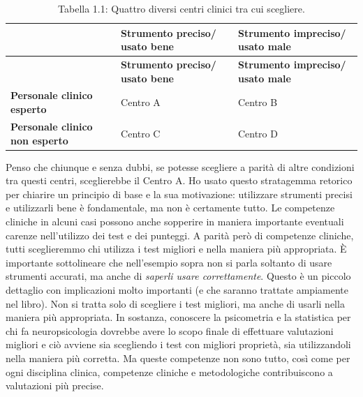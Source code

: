 \documentclass[
  italian,
  letterpaper,
  paper=A4,
  headinclude=on,
  footinclude=on,
  12pt]{scrbook}
\begin{document}
\begingroup
{\footnotesize

\begin{longtable}[]{@{}
  >{\centering\arraybackslash}p{}
  >{\centering\arraybackslash}p{}
  >{\centering\arraybackslash}p{}@{}}
\caption{Tabella 1.1: Quattro diversi centri clinici tra cui
scegliere.}\tabularnewline
\toprule\noalign{}
\begin{minipage}[b]{\linewidth}\centering
\end{minipage} & \begin{minipage}[b]{\linewidth}\centering
\textbf{Strumento preciso/ usato bene }
\end{minipage} & \begin{minipage}[b]{\linewidth}\centering
\textbf{Strumento impreciso/ usato male}
\end{minipage} \\
\midrule\noalign{}
\endfirsthead
\toprule\noalign{}
\begin{minipage}[b]{\linewidth}\centering
\end{minipage} & \begin{minipage}[b]{\linewidth}\centering
\textbf{Strumento preciso/ usato bene }
\end{minipage} & \begin{minipage}[b]{\linewidth}\centering
\textbf{Strumento impreciso/ usato male}
\end{minipage} \\
\midrule\noalign{}
\endhead
\bottomrule\noalign{}
\endlastfoot
\textbf{Personale clinico esperto} & Centro A & Centro B \\
\textbf{Personale clinico non esperto} & Centro C & Centro D \\
\end{longtable}

}
\endgroup

Penso che chiunque e senza dubbi, se potesse scegliere a parità di altre
condizioni tra questi centri, sceglierebbe il Centro A. Ho usato questo
stratagemma retorico per chiarire un principio di base e la sua
motivazione: utilizzare strumenti precisi e utilizzarli bene è
fondamentale, ma non è certamente tutto. Le competenze cliniche in
alcuni casi possono anche sopperire in maniera importante eventuali
carenze nell'utilizzo dei test e dei punteggi. A parità però di
competenze cliniche, tutti sceglieremmo chi utilizza i test migliori e
nella maniera più appropriata. È importante sottolineare che
nell'esempio sopra non si parla soltanto di usare strumenti accurati, ma
anche di \emph{saperli usare correttamente}. Questo è un piccolo
dettaglio con implicazioni molto importanti (e che saranno trattate
ampiamente nel libro). Non si tratta solo di scegliere i test migliori,
ma anche di usarli nella maniera più appropriata. In sostanza, conoscere
la psicometria e la statistica per chi fa neuropsicologia dovrebbe avere
lo scopo finale di effettuare valutazioni migliori e ciò avviene sia
scegliendo i test con migliori proprietà, sia utilizzandoli nella
maniera più corretta. Ma queste competenze non sono tutto, così come per
ogni disciplina clinica, competenze cliniche e metodologiche
contribuiscono a valutazioni più precise.
\end{document}
